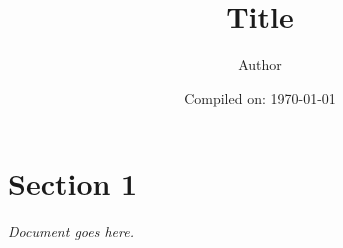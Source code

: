 \documentclass[11pt]{article}
\title{\textbf{Title}}
\author{Author}
\date{Compiled on: \today}
\begin{document}
\maketitle
{}
\setcounter{section}{0}

\section{Section 1}
\emph{Document goes here.}
\end{document}
